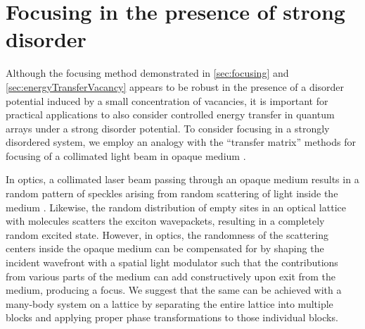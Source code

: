 






\section{Focusing in the presence of strong disorder}
\label{sec:focusingStrongDisorder}


Although the focusing method demonstrated in \autoref{sec:focusing} and \autoref{sec:energyTransferVacancy} appears to be robust in the presence of a disorder potential induced by a small concentration of vacancies, it is important for practical applications to also consider controlled energy transfer in quantum arrays under a strong disorder potential. To consider focusing in a strongly disordered system, 
we employ an analogy with the {``transfer
matrix'' methods for focusing of a collimated light beam in opaque
medium \cite{opaque-1, Gigan-TMeasure-PRL10, Mosk-NPhot10, Cizmar-NPhot10, Silberberg-11, Chatel-Focusing-11, Lagendijk-Focusing-11, zhenia-11, cui-11, kim-11}}.


In optics, a collimated laser beam passing through an opaque medium results in a random
pattern of speckles arising from random scattering of light inside the medium
\cite{RandomWave-books}. Likewise, the random distribution of empty sites in an optical lattice with molecules 
scatters the exciton wavepackets, resulting in a completely random excited state. 
However, in optics, the randomness of the scattering centers inside the opaque medium can be compensated for by
shaping the incident wavefront with a spatial light modulator such
that the contributions from various parts of the medium can add
constructively upon exit from the medium, producing a focus. 
We suggest that the same can be achieved with a many-body system on a lattice by 
separating the entire lattice into multiple blocks and applying proper phase transformations
to those individual blocks. 



